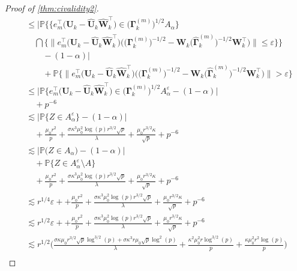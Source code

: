 \documentclass[10pt]{article}
\newcommand{\0}{{\mathbf{0}}}
\newcommand{\1}{{\mathbf{1}}}
\newcommand{\U}{{\mathbf{U}}}
\renewcommand{\t}{^{\top}}
\newcommand{\uhat}{\mathbf{\hat{U}}}
\newcommand{\p}{\mathbb{P}}
\renewcommand{\hat}{\widehat}
\renewcommand{\hat}{\widehat}
\begin{document}
\begin{proof}[Proof of \cref{thm:civalidity2}]
\begin{align*}
    &\leq \bigg| \p\Bigg\{ \bigg\{ e_m\t \bigg( \U_k - \uhat_k \mathbf{\hat W}_k\t \bigg) \in \big( \mathbf{\Gamma}^{(m)}_k\big)^{1/2} A_{\alpha}\bigg\} \\
    &\quad \bigcap \bigg\{ \bigg\| e_m\t \bigg( \U_k - \uhat_k \mathbf{\hat W}_k\t \bigg) \bigg( \big( \mathbf{\Gamma}^{(m)}_k \big)^{-1/2} - \mathbf{W}_k \big(\mathbf{\hat \Gamma}^{(m)}_k \big)^{-1/2} \mathbf{W}_k\t \bigg) \bigg\| \leq \varepsilon \bigg\} \Bigg\} \\
    &\qquad - (1- \alpha) \bigg| \\
    &\qquad + \p\bigg\{ \bigg\| e_m\t \bigg( \U_k - \uhat_k \mathbf{\hat W}_k\t \bigg) \bigg( \big( \mathbf{\Gamma}^{(m)}_k \big)^{-1/2} - \mathbf{W}_k \big(\mathbf{\hat \Gamma}^{(m)}_k \big)^{-1/2} \mathbf{W}_k\t \bigg) \bigg\| >  \varepsilon \bigg\} \\
    &\leq \bigg| \p\bigg\{ e_m\t \bigg( \U_k - \uhat_k \mathbf{\hat W}_k\t \bigg) \in \big(\mathbf{\Gamma}^{(m)}_k \big)^{1/2} A_{\alpha}^{\varepsilon} - (1- \alpha) \bigg| \\
    &\quad + p^{-6} \\
    &\lesssim \bigg| \p\bigg\{ Z \in A_{\alpha}^{\varepsilon} \bigg\} - (1 - \alpha) \bigg| \\
    &\quad + \frac{\mu_0 r^2}{p} + \frac{\sigma \kappa^3 \mu_0^2 \log(p) r^{3/2} \sqrt{p}}{\lambda} + \frac{\mu_0 r^{3/2} \kappa}{\sqrt{p}} + p^{-6} \\
    &\lesssim \bigg| \p\bigg( Z \in A_{\alpha} \bigg) - (1 - \alpha) \bigg| \\
    &\quad + \p\bigg\{ Z \in A_{\alpha}^{\varepsilon} \setminus A \bigg\} \\
    &\quad +  \frac{\mu_0 r^2}{p} + \frac{\sigma \kappa^3 \mu_0^2 \log(p) r^{3/2} \sqrt{p}}{\lambda} + \frac{\mu_0 r^{3/2} \kappa}{\sqrt{p}} + p^{-6}\\
    &\lesssim r^{1/4} \varepsilon + + \frac{\mu_0 r^2}{p} + \frac{\sigma \kappa^3 \mu_0^2 \log(p) r^{3/2} \sqrt{p}}{\lambda} + \frac{\mu_0 r^{3/2} \kappa}{\sqrt{p}} + p^{-6} \\
    &\lesssim r^{1/2} \varepsilon + + \frac{\mu_0 r^2}{p} + \frac{\sigma \kappa^3 \mu_0^2 \log(p) r^{3/2} \sqrt{p}}{\lambda} + \frac{\mu_0 r^{3/2} \kappa}{\sqrt{p}} + p^{-6} \\
    &\lesssim r^{1/2} \bigg( \frac{ \sigma \kappa \mu_0 r^{3/2} \sqrt{p} \log^{3/2}(p) + \sigma \kappa^3 r \mu_0 \sqrt{p} \log^2(p)}{\lambda} + \frac{\kappa^2 \mu_0^2 r \log^{3/2}(p)}{p} + \frac{\kappa \mu_0^2 r^2 \log(p)}{p} \bigg) \\

\end{align*}
\end{proof}
\end{document}
